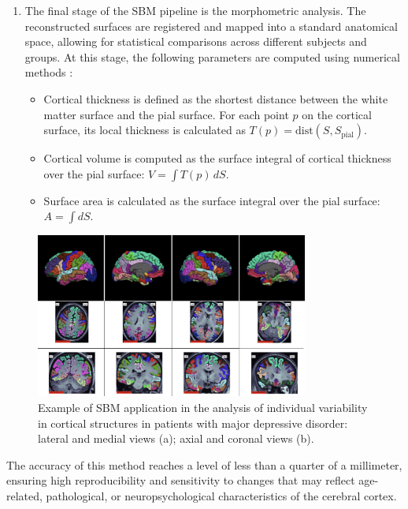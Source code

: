 \documentclass[default]{subfiles}
\begin{document}
\begin{enumerate}
    \item  The final stage of the SBM pipeline is the morphometric analysis. The reconstructed surfaces are registered
    and mapped into a standard anatomical space, allowing for statistical comparisons across different subjects and
    groups. At this stage, the following parameters are computed using numerical methods \cite{fischl_2000}:

    \begin{itemize}
      \item Cortical thickness is defined as the shortest distance between the white matter surface and the pial
      surface. For each point $p$ on the cortical surface, its local thickness is calculated as
      $T(p) = \text{dist}(S, S_{\text{pial}})$.
    
      \item Cortical volume is computed as the surface integral of cortical thickness over the pial surface:
      $V = \int T(p) \, dS$.
    
      \item Surface area is calculated as the surface integral over the pial surface: $A = \int dS$. \newline
    \end{itemize}
\end{enumerate}

\begin{figure}[H]
    \centering
    \includegraphics[width=0.8\textwidth]{image/pic3.png}
    \caption{
      Example of SBM application in the analysis of individual variability in cortical structures in patients
      with major depressive disorder: lateral and medial views (a); axial and coronal views (b).
    }
\end{figure}

The accuracy of this method reaches a level of less than a quarter of a millimeter, ensuring high reproducibility and
sensitivity to changes that may reflect age-related, pathological, or neuropsychological characteristics of the
cerebral cortex.
\end{document}
